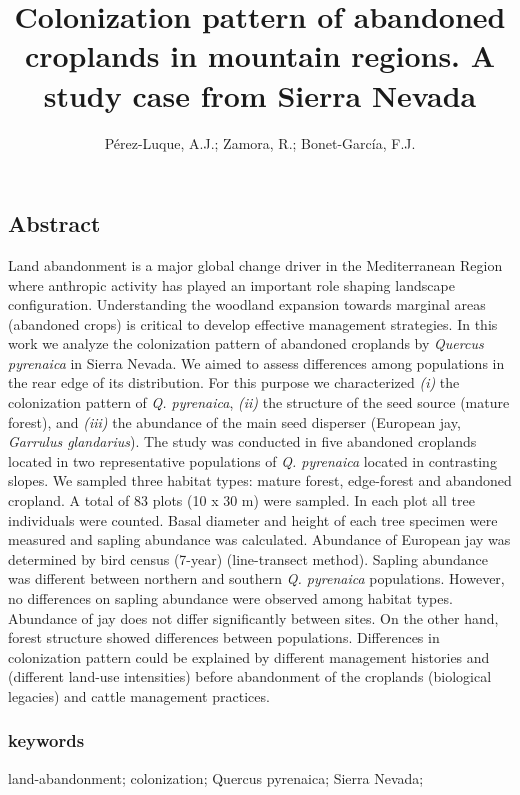 \documentclass[
]{article}
\title{Colonization pattern of abandoned croplands in mountain regions.
A study case from Sierra Nevada}
\author{Pérez-Luque, A.J.; Zamora, R.; Bonet-García, F.J.}
\date{}
\begin{document}
\maketitle

\hypertarget{abstract}{%
\subsection{Abstract}\label{abstract}}

Land abandonment is a major global change driver in the Mediterranean
Region where anthropic activity has played an important role shaping
landscape configuration. Understanding the woodland expansion towards
marginal areas (abandoned crops) is critical to develop effective
management strategies. In this work we analyze the colonization pattern
of abandoned croplands by \emph{Quercus pyrenaica} in Sierra Nevada. We
aimed to assess differences among populations in the rear edge of its
distribution. For this purpose we characterized \emph{(i)} the
colonization pattern of \emph{Q. pyrenaica}, \emph{(ii)} the structure
of the seed source (mature forest), and \emph{(iii)} the abundance of
the main seed disperser (European jay, \emph{Garrulus glandarius}). The
study was conducted in five abandoned croplands located in two
representative populations of \emph{Q. pyrenaica} located in contrasting
slopes. We sampled three habitat types: mature forest, edge-forest and
abandoned cropland. A total of 83 plots (10 x 30 m) were sampled. In
each plot all tree individuals were counted. Basal diameter and height
of each tree specimen were measured and sapling abundance was
calculated. Abundance of European jay was determined by bird census
(7-year) (line-transect method). Sapling abundance was different between
northern and southern \emph{Q. pyrenaica} populations. However, no
differences on sapling abundance were observed among habitat types.
Abundance of jay does not differ significantly between sites. On the
other hand, forest structure showed differences between populations.
Differences in colonization pattern could be explained by different
management histories and (different land-use intensities) before
abandonment of the croplands (biological legacies) and cattle management
practices.

\hypertarget{keywords}{%
\subsubsection{keywords}\label{keywords}}

land-abandonment; colonization; Quercus pyrenaica; Sierra Nevada;
\end{document}
